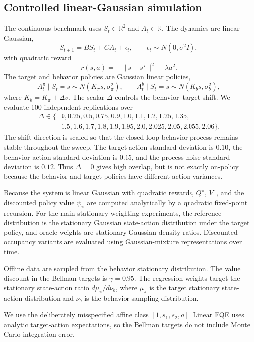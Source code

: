 \documentclass{article}
\theoremstyle{plain}
\theoremstyle{definition}
\theoremstyle{remark}
\begin{document}
\subsection{Controlled linear-Gaussian simulation}

The continuous benchmark uses \(S_t\in\mathbb R^2\) and \(A_t\in\mathbb R\).
The dynamics are linear Gaussian,
\[
S_{t+1}=B S_t + C A_t+\epsilon_t,
\qquad
\epsilon_t\sim N(0,\sigma^2 I),
\]
with quadratic reward
\[
r(s,a)=-\|s-s^\star\|^2-\lambda a^2 .
\]
The target and behavior policies are Gaussian linear policies,
\[
A_t^\pi\mid S_t=s \sim N(K_\pi s,\sigma_\pi^2),
\qquad
A_t^b\mid S_t=s \sim N(K_b s,\sigma_b^2),
\]
where \(K_b=K_\pi+\Delta v\). The scalar \(\Delta\) controls the
behavior--target shift. We evaluate 100 independent replications over
\[
\begin{aligned}
\Delta\in\{&
0,0.25,0.5,0.75,0.9,1.0,1.1,1.2,1.25,1.35,\\
&1.5,1.6,1.7,1.8,1.9,1.95,2.0,2.025,2.05,2.055,2.06\}.
\end{aligned}
\]
The shift direction is scaled so that the closed-loop behavior process remains
stable throughout the sweep. The target action standard deviation is \(0.10\),
the behavior action standard deviation is \(0.15\), and the process-noise
standard deviation is \(0.12\). Thus \(\Delta=0\) gives high overlap, but is not
exactly on-policy because the behavior and target policies have different
action variances.

Because the system is linear Gaussian with quadratic rewards, \(Q^\pi\),
\(V^\pi\), and the discounted policy value \(\psi_\pi\) are computed
analytically by a quadratic fixed-point recursion. For the main stationary
weighting experiments, the reference distribution is the stationary Gaussian
state-action distribution under the target policy, and oracle weights are
stationary Gaussian density ratios. Discounted occupancy variants are evaluated
using Gaussian-mixture representations over time.

Offline data are sampled from the behavior stationary distribution. The value
discount in the Bellman targets is \(\gamma=0.95\). The regression weights
target the stationary state-action ratio \(d\mu_\pi/d\nu_b\), where
\(\mu_\pi\) is the target stationary state-action distribution and \(\nu_b\) is
the behavior sampling distribution.

We use the deliberately misspecified affine class \([1,s_1,s_2,a]\). Linear FQE
uses analytic target-action expectations, so the Bellman targets do not include
Monte Carlo integration error.
\end{document}
